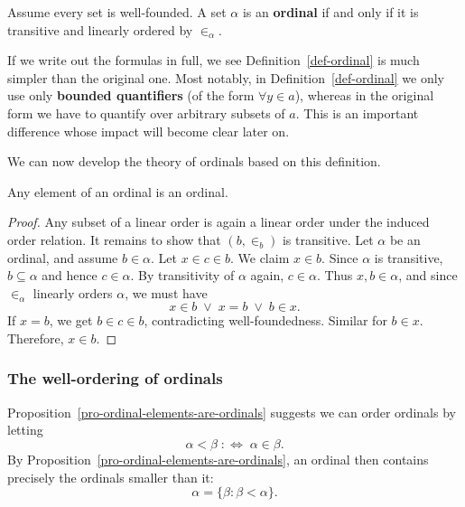 \begin{proposition}\label{pro-ordinal-linear-order}Assume every set is well-founded. A set $\alpha$ is an \textbf{ordinal} if and only if it is transitive and linearly ordered by $\in_\alpha$.

\end{proposition}If we write out the formulas in full, we see Definition~\ref{def-ordinal} is much simpler than the original one. Most notably, in Definition~\ref{def-ordinal} we only use only \textbf{bounded quantifiers} (of the form $\forall y \in a$), whereas in the original form we have to quantify over arbitrary subsets of $a$. This is an important difference whose impact will become clear later on.

We can now develop the theory of ordinals based on this definition.

\begin{proposition}\label{pro-ordinal-elements-are-ordinals}Any element of an ordinal is an ordinal.

\end{proposition}\begin{proof}Any subset of a linear order is again a linear order under the induced order relation. It remains to show that $(b, \in_b)$ is transitive. Let $\alpha$ be an ordinal, and assume $b \in \alpha$. Let $x \in c \in b$. We claim $x \in b$. Since $\alpha$ is transitive, $b \subseteq \alpha$ and hence $c \in \alpha$. By transitivity of $\alpha$ again, $c \in \alpha$. Thus $x,b \in \alpha$, and since $\in_\alpha$ linearly orders $\alpha$, we must have
\begin{equation}

x \in b \; \vee \; x = b \; \vee \; b \in x.
\end{equation}
If $x = b$, we get $b \in c \in b$, contradicting well-foundedness. Similar for $b \in x$. Therefore, $x \in b$.

\end{proof}\subsubsection{The well-ordering of ordinals}

Proposition~\ref{pro-ordinal-elements-are-ordinals} suggests we can order ordinals by letting
\begin{equation}

\alpha < \beta \; :\iff \; \alpha \in \beta.
\end{equation}
By Proposition~\ref{pro-ordinal-elements-are-ordinals}, an ordinal then contains precisely the ordinals smaller than it:
\begin{equation}

\alpha = \{ \beta : \beta < \alpha \}.
\end{equation}

